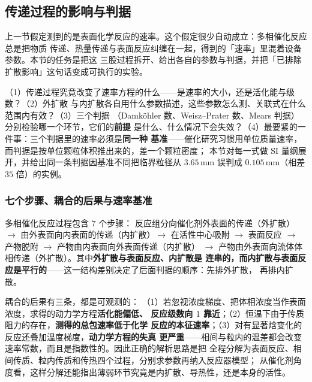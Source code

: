 \subsection{传递过程的影响与判据}
\label{sec:ch10-transport}

上一节假定测到的是表面化学反应的速率。这个假定很少自动成立：多相催化反应总是把物质
传递、热量传递与表面反应纠缠在一起，得到的「速率」里混着设备参数。本节的任务是把这
三股过程拆开、给出各自的参数与判据，并把「已排除扩散影响」这句话变成可执行的实验。

\begin{probout}
（1）传递过程究竟改变了速率方程的什么——是速率的大小，还是活化能与级数？（2）外扩散
与内扩散各自用什么参数描述，这些参数怎么测、关联式在什么范围内有效？（3）三个判据
（Damk\"ohler 数、Weisz--Prater 数、Mears 判据）分别检验哪一个环节，它们的\textbf{前提}
是什么、什么情况下会失效？（4）最要紧的一件事：三个判据里的速率必须是\textbf{同一种
基准}——催化研究习惯用单位质量速率，而判据是按单位颗粒体积推出来的，差一个颗粒密度；
本节对每一式做 SI 量纲展开，并给出同一条判据因基准不同把临界粒径从 $3.65$\,\unit{mm}
误判成 $0.105$\,\unit{mm}（相差 $35$ 倍）的实例。
\end{probout}

\subsubsection{七个步骤、耦合的后果与速率基准}

多相催化反应过程包含 $7$ 个步骤：
反应组分向催化剂外表面的传递（外扩散）$\to$ 由外表面向内表面的传递（内扩散）$\to$
在活性中心吸附 $\to$ 表面反应 $\to$ 产物脱附 $\to$ 产物由内表面向外表面传递（内扩散）
$\to$ 产物由外表面向流体体相传递（外扩散）。其中\textbf{外扩散与表面反应、内扩散是
连串的，而内扩散与表面反应是平行的}——这一结构差别决定了后面判据的顺序：先排外扩散，
再排内扩散。

耦合的后果有三条，都是可观测的：
（1）若忽视浓度梯度、把体相浓度当作表面浓度，求得的动力学方程\textbf{活化能偏低、
反应级数向 $1$ 靠近}；（2）恒温下由于传质阻力的存在，\textbf{测得的总包速率低于化学
反应的本征速率}；（3）对有显著焓变化的反应还叠加温度梯度，\textbf{动力学方程的失真
更严重}——相间与粒内的温差都会改变速率常数，而且是指数性的。因此正确的解析思路是把
全程分解为表面反应、相间传质、粒内传质和传热四个过程，分别求参数再纳入反应器模型；
从催化剂角度看，这样分解还能指出薄弱环节究竟是内扩散、导热性，还是本身的活性。

